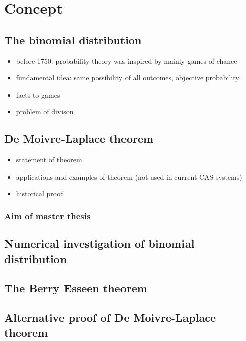 \chapter{Concept}

\section{The binomial distribution}

\begin{itemize}
  \item before 1750: probability theory was inspired by mainly games of chance~\cite[p. 4]{hald1}
  \item fundamental idea: same possibility of all outcomes, objective probability\cite[chapter 3]{hald1}
  \item facts to games \cite[p 33/34]{hald1}
  \item problem of divison \cite[chapter 5]{hald1}
\end{itemize}

\section{De Moivre-Laplace theorem}

\begin{itemize}
  \item statement of theorem
  \item applications and examples of theorem (not used in current CAS systems)
  \item historical proof 
                                                                                                               \end{itemize}

\subsection{Aim of master thesis}

\section{Numerical investigation of binomial distribution}

\section{The Berry Esseen theorem}

\section{Alternative proof of De Moivre-Laplace theorem}
